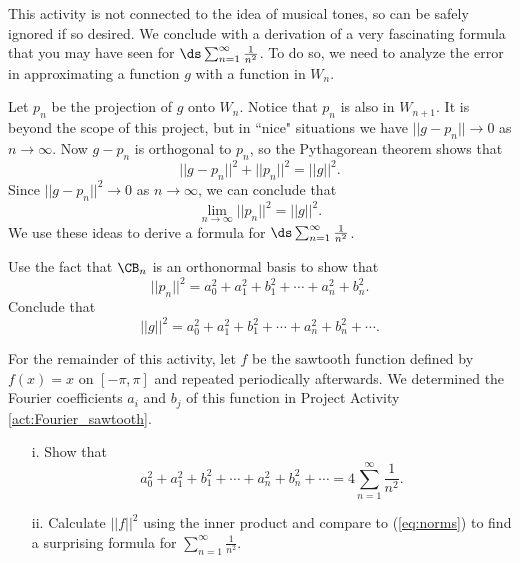 \begin{pactivity} \label{act:Fourier_square_sums} This activity is not connected to the idea of musical tones, so can be safely ignored if so desired. We conclude with a derivation of a very fascinating formula that you may have seen for $\ds \sum_{n=1}^{\infty} \frac{1}{n^2}$. To do so, we need to analyze the error in approximating a function $g$ with a function in $W_n$.

Let $p_n$ be the projection of $g$ onto $W_n$. Notice that $p_n$ is also in $W_{n+1}$. It is beyond the scope of this project, but in ``nice" situations we have $||g - p_n|| \to 0$ as $n \to \infty$. Now $g - p_n$ is orthogonal to $p_n$, so the Pythagorean theorem shows that
\[||g-p_n||^2 + ||p_n||^2 = ||g||^2.\]
Since $||g-p_n||^2 \to 0$ as $n \to \infty$, we can conclude that
\begin{equation}
\lim_{n \to \infty} ||p_n||^2 = ||g||^2. \label{eq:Fourier_norm}
\end{equation}
We use these ideas to derive a formula for $\ds \sum_{n=1}^{\infty} \frac{1}{n^2}$.
	\ba
	\item Use the fact that $\CB_n$ is an orthonormal basis to show that
\[||p_n||^2 = a_0^2 +a_1^2 + b_1^2 + \cdots + a_n^2 + b_n^2.\]
Conclude that
\begin{equation}
||g||^2 = a_0^2 +a_1^2 + b_1^2 + \cdots + a_n^2 + b_n^2 + \cdots . \label{eq:norms}
\end{equation}


	\item For the remainder of this activity, let $f$ be the sawtooth function defined by $f(x) = x$ on $[-\pi,\pi]$ and repeated periodically afterwards. We determined the Fourier coefficients $a_i$ and $b_j$ of this function in Project Activity \ref{act:Fourier_sawtooth}.
		\begin{enumerate}
		\item[i.] Show that
\[a_0^2 +a_1^2 + b_1^2 + \cdots + a_n^2 + b_n^2 + \cdots = 4\sum_{n=1}^{\infty} \frac{1}{n^2}.\]

		\item[ii.] Calculate $||f||^2$ using the inner product and compare to (\ref{eq:norms}) to find a surprising formula for $\sum_{n=1}^{\infty} \frac{1}{n^2}$.

		
		\end{enumerate}
			
	\ea
\end{pactivity} 	


